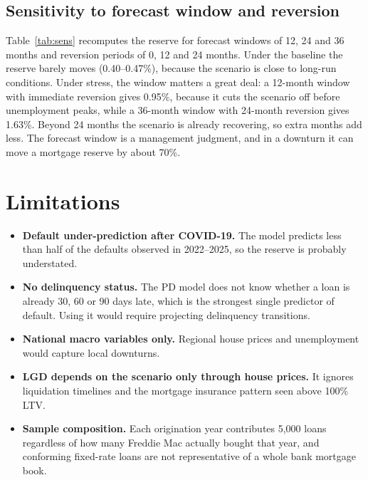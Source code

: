 \documentclass[11pt]{article}
\begin{document}
\subsection{Sensitivity to forecast window and reversion}
Table~\ref{tab:sens} recomputes the reserve for forecast windows of 12, 24 and 36 months and reversion periods of 0, 12
and 24 months. Under the baseline the reserve barely moves (0.40--0.47\%), because the scenario is close to long-run
conditions. Under stress, the window matters a great deal: a 12-month window with immediate reversion gives 0.95\%,
because it cuts the scenario off before unemployment peaks, while a 36-month window with 24-month reversion gives 1.63\%.
Beyond 24 months the scenario is already recovering, so extra months add less. The forecast window is a management
judgment, and in a downturn it can move a mortgage reserve by about 70\%.

\begin{table}[t]
\centering\small
\caption{Reserve rate (\% of balance) by forecast window and reversion period. Base case: 24-month window, 12-month reversion.}
\label{tab:sens}

\end{table}

\section{Limitations}
\begin{itemize}
  \item \textbf{Default under-prediction after COVID-19.} The model predicts less than half of the defaults observed in
        2022--2025, so the reserve is probably understated.
  \item \textbf{No delinquency status.} The PD model does not know whether a loan is already 30, 60 or 90 days late,
        which is the strongest single predictor of default. Using it would require projecting delinquency transitions.
  \item \textbf{National macro variables only.} Regional house prices and unemployment would capture local downturns.
  \item \textbf{LGD depends on the scenario only through house prices.} It ignores liquidation timelines and the
        mortgage insurance pattern seen above 100\% LTV.
  \item \textbf{Sample composition.} Each origination year contributes 5,000 loans regardless of how many Freddie Mac
        actually bought that year, and conforming fixed-rate loans are not representative of a whole bank mortgage book.
\end{itemize}
\end{document}
